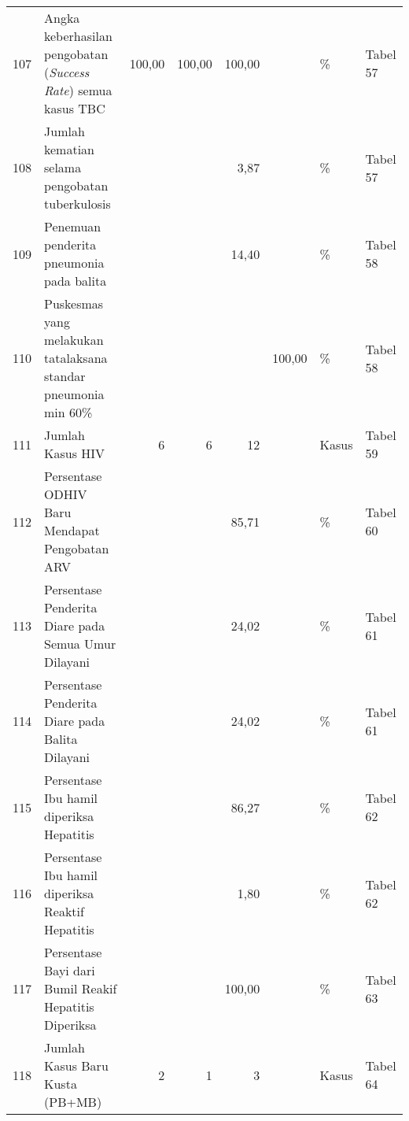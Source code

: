 \begin{small}
\begin{longtable}{rY{12em}rrrrY{5em}Y{5em}}
	107 & Angka keberhasilan pengobatan (\emph{Success Rate}) semua kasus TBC         & 100,00 & 100,00 &             100,00 &          & \%                             & Tabel 57 \\
	108 & Jumlah kematian selama pengobatan tuberkulosis                              &        &        &               3,87 &          & \%                             & Tabel 57 \\
	109 & Penemuan penderita pneumonia pada balita                                    &        &        &              14,40 &          & \%                             & Tabel 58 \\
	110 & Puskesmas yang melakukan tatalaksana standar pneumonia min 60\%             &        &        &                    &   100,00 & \%                             & Tabel 58 \\
	111 & Jumlah Kasus HIV                                                            &      6 &      6 &                 12 &          & Kasus                          & Tabel 59 \\
	112 & Persentase ODHIV Baru Mendapat Pengobatan ARV                               &        &        &              85,71 &          & \%                             & Tabel 60 \\
	113 & Persentase Penderita Diare pada Semua Umur Dilayani                         &        &        &              24,02 &          & \%                             & Tabel 61 \\
	114 & Persentase Penderita Diare pada Balita Dilayani                             &        &        &              24,02 &          & \%                             & Tabel 61 \\
	115 & Persentase Ibu hamil diperiksa Hepatitis                                    &        &        &              86,27 &          & \%                             & Tabel 62 \\
	116 & Persentase Ibu hamil diperiksa Reaktif Hepatitis                            &        &        &               1,80 &          & \%                             & Tabel 62 \\
	117 & Persentase Bayi dari Bumil Reakif Hepatitis Diperiksa                       &        &        &             100,00 &          & \%                             & Tabel 63 \\
	118 & Jumlah Kasus Baru Kusta (PB+MB)                                             &      2 &      1 &                  3 &          & Kasus                          & Tabel 64 \\

\end{longtable}
\end{small}
